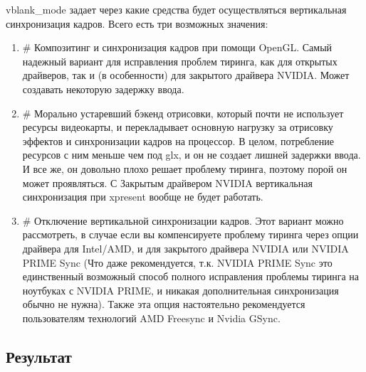 \documentclass[letterpaper,10pt,russian,openany]{sphinxmanual}
\begin{document}
\sphinxAtStartPar
vblank\_mode задает через какие средства будет осуществляться вертикальная синхронизация кадров. Всего есть три возможных значения:
\begin{enumerate}
%
\item {} 
\sphinxAtStartPar
{} \# Композитинг и синхронизация кадров при помощи OpenGL.
Самый надежный вариант для исправления проблем тиринга, как для открытых драйверов, так и (в особенности) для закрытого драйвера NVIDIA.
Может создавать некоторую задержку ввода.

\item {} 
\sphinxAtStartPar
{} \# Морально устаревший бэкенд отрисовки, который почти не использует ресурсы видеокарты,
и перекладывает основную нагрузку за отрисовку эффектов и синхронизации кадров на процессор.
В целом, потребление ресурсов с ним меньше чем под glx, и он не создает лишней задержки ввода.
И все же, он довольно плохо решает проблему тиринга, поэтому порой он может проявляться.
С Закрытым драйвером NVIDIA вертикальная синхронизация при xpresent вообще не будет работать.

\item {} 
\sphinxAtStartPar
{} \# Отключение вертикальной синхронизации кадров.
Этот вариант можно рассмотреть, в случае если вы компенсируете проблему тиринга через опции драйвера  для Intel/AMD,
и  для закрытого драйвера NVIDIA или NVIDIA PRIME Sync
(Что даже рекомендуется, т.к. NVIDIA PRIME Sync это единственный возможный способ полного исправления проблемы тиринга на ноутбуках с NVIDIA PRIME,
и никакая дополнительная синхронизация обычно не нужна).
Также эта опция настоятельно рекомендуется пользователям технологий AMD Freesync и Nvidia G\sphinxhyphen{}Sync.

\end{enumerate}

\ignorespaces 

\subsection{Результат}
\label{\detokenize{source/de-optimizations:xfce-result}}\label{\detokenize{source/de-optimizations:index-21}}\label{\detokenize{source/de-optimizations:id10}}
\noindent{}
\end{document}

